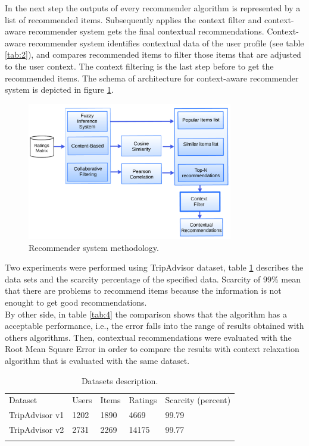 In the next step the outputs of every recommender algorithm is
represented by a list of recommended items. Subsequently applies the
context filter and context-aware recommender system gets the final
contextual recommendations. Context-aware
recommender system identifies contextual data of the user profile (see
table \ref{tab:2}), and compares recommended items to filter those
items that are adjusted to the user context. 
The context filtering is the last step before to get the recommended
items. The schema of architecture for context-aware recommender system
is depicted in figure \ref{fig:architecture}.
\begin{figure}
\captionsetup{font=footnotesize}
\centering
\includegraphics[width=0.80\textwidth]{img/archit-ta.png}
\caption{Recommender system methodology.}
\label{fig:architecture}   
\end{figure}
Two experiments were performed using TripAdvisor dataset, table
\ref{tab:3} describes the data sets and the scarcity percentage of the
specified data. Scarcity of 99\% mean that there are problems to
recommend items because the information is not enought to get 
good recommendations.\\  By other side, in table \ref{tab:4} the comparison
shows that the algorithm has a acceptable performance, i.e., the error
falls into the range of results obtained with others algorithms. Then,
contextual recommendations were evaluated with the Root Mean Square
Error in order to compare the results with context relaxation
algorithm\cite{zheng2012differential} that is evaluated with the same
dataset.
\begin{table}
\centering
\small
\captionsetup{font=footnotesize}
\caption{Datasets description.}
\label{tab:3}      
\begin{tabular}{lllll}
\hline\noalign{\smallskip}
Dataset & Users & Items & Ratings & Scarcity (percent) \\
\noalign{\smallskip}\hline\noalign{\smallskip}
TripAdvisor v1 & 1202 & 1890 & 4669 & 99.79 \\
TripAdvisor v2 & 2731 & 2269 & 14175 & 99.77 \\
\noalign{\smallskip}\hline
\end{tabular}
\end{table}

